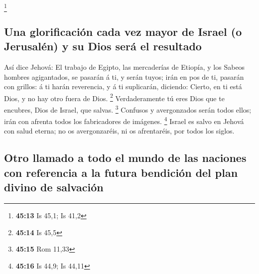 \footnote{\textbf{45:13} Is 45,1; Is 41,2}

\hypertarget{una-glorificaciuxf3n-cada-vez-mayor-de-israel-o-jerusaluxe9n-y-su-dios-seruxe1-el-resultado}{%
\subsection{Una glorificación cada vez mayor de Israel (o Jerusalén) y
su Dios será el
resultado}\label{una-glorificaciuxf3n-cada-vez-mayor-de-israel-o-jerusaluxe9n-y-su-dios-seruxe1-el-resultado}}

 Así dice Jehová: El trabajo de Egipto, las mercaderías
de Etiopía, y los Sabeos hombres agigantados, se pasarán á ti, y serán
tuyos; irán en pos de ti, pasarán con grillos: á ti harán reverencia, y
á ti suplicarán, diciendo: Cierto, en ti está Dios, y no hay otro fuera
de Dios. \footnote{\textbf{45:14} Is 45,5} 
Verdaderamente tú eres Dios que te encubres, Dios de Israel, que salvas.
\footnote{\textbf{45:15} Rom 11,33}  Confusos y
avergonzados serán todos ellos; irán con afrenta todos los fabricadores
de imágenes. \footnote{\textbf{45:16} Is 44,9; Is 44,11} 
Israel es salvo en Jehová con salud eterna; no os avergonzaréis, ni os
afrentaréis, por todos los siglos.

\hypertarget{otro-llamado-a-todo-el-mundo-de-las-naciones-con-referencia-a-la-futura-bendiciuxf3n-del-plan-divino-de-salvaciuxf3n}{%
\subsection{Otro llamado a todo el mundo de las naciones con referencia
a la futura bendición del plan divino de
salvación}\label{otro-llamado-a-todo-el-mundo-de-las-naciones-con-referencia-a-la-futura-bendiciuxf3n-del-plan-divino-de-salvaciuxf3n}}

